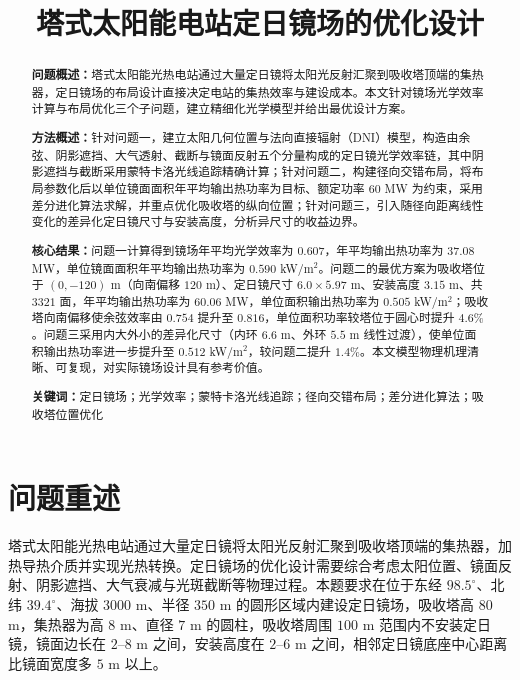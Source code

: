 \documentclass[12pt]{ctexart}
\title{\heiti 塔式太阳能电站定日镜场的优化设计}
\author{}
\date{}
\begin{document}
\maketitle

\begin{abstract}
\textbf{问题概述：}塔式太阳能光热电站通过大量定日镜将太阳光反射汇聚到吸收塔顶端的集热器，定日镜场的布局设计直接决定电站的集热效率与建设成本。本文针对镜场光学效率计算与布局优化三个子问题，建立精细化光学模型并给出最优设计方案。

\textbf{方法概述：}针对问题一，建立太阳几何位置与法向直接辐射（DNI）模型，构造由余弦、阴影遮挡、大气透射、截断与镜面反射五个分量构成的定日镜光学效率链，其中阴影遮挡与截断采用蒙特卡洛光线追踪精确计算；针对问题二，构建径向交错布局，将布局参数化后以单位镜面面积年平均输出热功率为目标、额定功率 $60$ MW 为约束，采用差分进化算法求解，并重点优化吸收塔的纵向位置；针对问题三，引入随径向距离线性变化的差异化定日镜尺寸与安装高度，分析异尺寸的收益边界。

\textbf{核心结果：}问题一计算得到镜场年平均光学效率为 $0.607$，年平均输出热功率为 $37.08$ MW，单位镜面面积年平均输出热功率为 $0.590$ kW/m$^2$。问题二的最优方案为吸收塔位于 $(0,-120)$ m（向南偏移 $120$ m）、定日镜尺寸 $6.0\times5.97$ m、安装高度 $3.15$ m、共 $3321$ 面，年平均输出热功率为 $60.06$ MW，单位面积输出热功率为 $0.505$ kW/m$^2$；吸收塔向南偏移使余弦效率由 $0.754$ 提升至 $0.816$，单位面积功率较塔位于圆心时提升 $4.6\%$。问题三采用内大外小的差异化尺寸（内环 $6.6$ m、外环 $5.5$ m 线性过渡），使单位面积输出热功率进一步提升至 $0.512$ kW/m$^2$，较问题二提升 $1.4\%$。本文模型物理机理清晰、可复现，对实际镜场设计具有参考价值。

\medskip
\noindent\textbf{关键词：}定日镜场；光学效率；蒙特卡洛光线追踪；径向交错布局；差分进化算法；吸收塔位置优化
\end{abstract}

\section{问题重述}
塔式太阳能光热电站通过大量定日镜将太阳光反射汇聚到吸收塔顶端的集热器，加热导热介质并实现光热转换。定日镜场的优化设计需要综合考虑太阳位置、镜面反射、阴影遮挡、大气衰减与光斑截断等物理过程。本题要求在位于东经 $98.5^\circ$、北纬 $39.4^\circ$、海拔 $3000$ m、半径 $350$ m 的圆形区域内建设定日镜场，吸收塔高 $80$ m，集热器为高 $8$ m、直径 $7$ m 的圆柱，吸收塔周围 $100$ m 范围内不安装定日镜，镜面边长在 $2$--$8$ m 之间，安装高度在 $2$--$6$ m 之间，相邻定日镜底座中心距离比镜面宽度多 $5$ m 以上。
\end{document}
